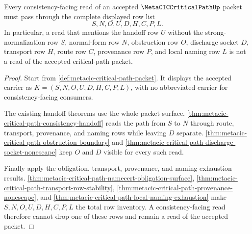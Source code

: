 \begin{theorem}
\label{thm:metacic-critical-path-handoff-row-totality}
Every consistency-facing read of an accepted $\MetaCICCriticalPathUp$ packet must pass through the complete displayed row list
$$
S,N,O,U,D,H,C,P,L.
$$
In particular, a read that mentions the handoff row $U$ without the strong-normalization row $S$, normal-form row $N$, obstruction row $O$, discharge socket $D$, transport row $H$, route row $C$, provenance row $P$, and local naming row $L$ is not a read of the accepted critical-path packet.
\end{theorem}
\begin{proof}
Start from \autoref{def:metacic-critical-path-packet}. It displays the accepted carrier as $K=(S,N,O,U,D,H,C,P,L)$, with no abbreviated carrier for consistency-facing consumers.

The existing handoff theorems use the whole packet surface. \autoref{thm:metacic-critical-path-consistency-handoff} reads the path from $S$ to $N$ through route, transport, provenance, and naming rows while leaving $D$ separate. \autoref{thm:metacic-critical-path-obstruction-boundary} and \autoref{thm:metacic-critical-path-discharge-socket-nonescape} keep $O$ and $D$ visible for every such read.

Finally apply the obligation, transport, provenance, and naming exhaustion results. \autoref{thm:metacic-critical-path-namecert-obligation-surface}, \autoref{thm:metacic-critical-path-transport-row-stability}, \autoref{thm:metacic-critical-path-provenance-nonescape}, and \autoref{thm:metacic-critical-path-local-naming-exhaustion} make $S,N,O,U,D,H,C,P,L$ the total row inventory. A consistency-facing read therefore cannot drop one of these rows and remain a read of the accepted packet.
\end{proof}

